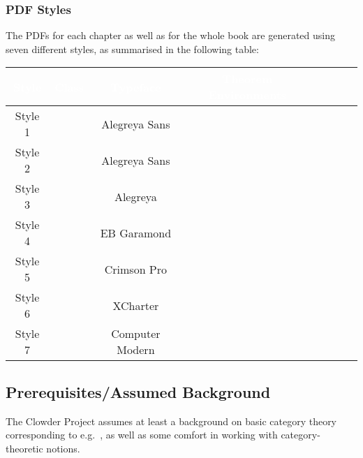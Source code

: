 \subsubsection{PDF Styles}\label{subsubsection-pdf-styles}
The PDFs for each chapter as well as for the whole book are generated using seven different styles, as summarised in the following table:
\begingroup%
\renewcommand{\arraystretch}{1.2}
\begin{center}
    \begin{tabular}{|Sc|Sc|Sc|Sc|}\hline{}
        \textcolor{white}{\textbf{Style}} & \textcolor{white}{\textbf{Class}} & \textcolor{white}{\textbf{Typeface}} & \textcolor{white}{\textbf{Theorem Environments}}\\\hline{}
        Style 1                           &                        & Alegreya Sans                        &                                    \\
        Style 2                           &                        & Alegreya Sans                        &                                    \\
        Style 3                           &                        & Alegreya                             &                                    \\
        Style 4                           &                        & EB Garamond                          &                                    \\
        Style 5                           &                        & Crimson Pro                          &                                    \\
        Style 6                           &                        & XCharter                             &                                    \\
        Style 7                           &                        & Computer Modern                      &                                    \\\hline
    \end{tabular}
\end{center}
\endgroup
\subsection{Prerequisites/Assumed Background}\label{subsection-prerequisites-assumed-background}
The Clowder Project assumes at least a background on basic category theory corresponding to e.g.\ \cite{category-theory-in-context}, as well as some comfort in working with category-theoretic notions.
